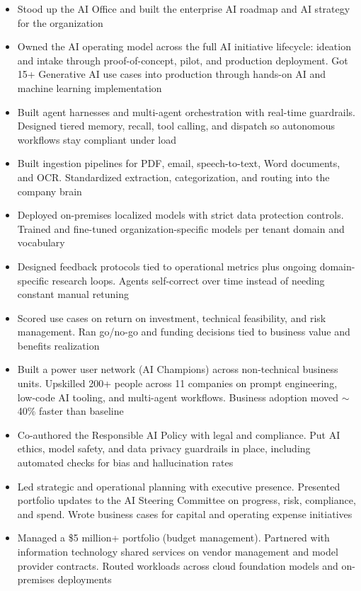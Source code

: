 \documentclass[10pt]{article}
\begin{document}
\begin{itemize}
  \item Stood up the AI Office and built the enterprise AI roadmap and AI strategy for the organization
  \item Owned the AI operating model across the full AI initiative lifecycle: ideation and intake through proof-of-concept, pilot, and production deployment. Got 15+ Generative AI use cases into production through hands-on AI and machine learning implementation
  \item Built agent harnesses and multi-agent orchestration with real-time guardrails. Designed tiered memory, recall, tool calling, and dispatch so autonomous workflows stay compliant under load
  \item Built ingestion pipelines for PDF, email, speech-to-text, Word documents, and OCR. Standardized extraction, categorization, and routing into the company brain
  \item Deployed on-premises localized models with strict data protection controls. Trained and fine-tuned organization-specific models per tenant domain and vocabulary
  \item Designed feedback protocols tied to operational metrics plus ongoing domain-specific research loops. Agents self-correct over time instead of needing constant manual retuning
  \item Scored use cases on return on investment, technical feasibility, and risk management. Ran go/no-go and funding decisions tied to business value and benefits realization
  \item Built a power user network (AI Champions) across non-technical business units. Upskilled 200+ people across 11 companies on prompt engineering, low-code AI tooling, and multi-agent workflows. Business adoption moved $\sim$40\% faster than baseline
  \item Co-authored the Responsible AI Policy with legal and compliance. Put AI ethics, model safety, and data privacy guardrails in place, including automated checks for bias and hallucination rates
  \item Led strategic and operational planning with executive presence. Presented portfolio updates to the AI Steering Committee on progress, risk, compliance, and spend. Wrote business cases for capital and operating expense initiatives
  \item Managed a \$5 million+ portfolio (budget management). Partnered with information technology shared services on vendor management and model provider contracts. Routed workloads across cloud foundation models and on-premises deployments
\end{itemize}
\end{document}

